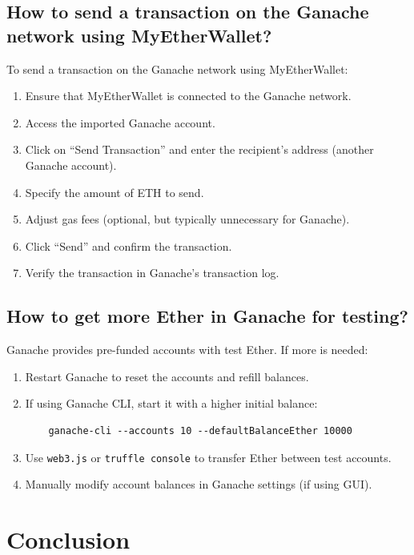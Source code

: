 \documentclass[11pt]{article}
\begin{document}
\subsection{How to send a transaction on the Ganache network using MyEtherWallet?}

To send a transaction on the Ganache network using MyEtherWallet:
\begin{enumerate}
    \item Ensure that MyEtherWallet is connected to the Ganache network.
    \item Access the imported Ganache account.
    \item Click on “Send Transaction” and enter the recipient’s address (another Ganache account).
    \item Specify the amount of ETH to send.
    \item Adjust gas fees (optional, but typically unnecessary for Ganache).
    \item Click “Send” and confirm the transaction.
    \item Verify the transaction in Ganache’s transaction log.
\end{enumerate}

\subsection{How to get more Ether in Ganache for testing?}

Ganache provides pre-funded accounts with test Ether. If more is needed:
\begin{enumerate}
    \item Restart Ganache to reset the accounts and refill balances.
    \item If using Ganache CLI, start it with a higher initial balance:
    \begin{verbatim}
    ganache-cli --accounts 10 --defaultBalanceEther 10000
    \end{verbatim}
    \item Use \texttt{web3.js} or \texttt{truffle console} to transfer Ether between test accounts.
    \item Manually modify account balances in Ganache settings (if using GUI).
\end{enumerate}

\section{Conclusion}
\end{document}

